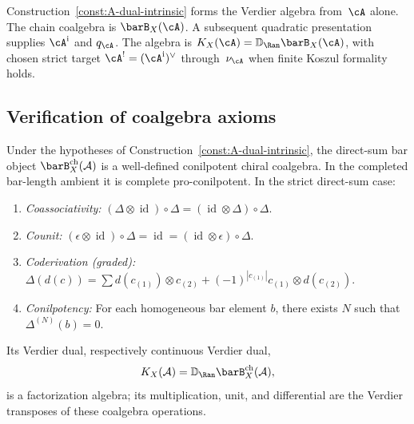 \begin{remark}\label{rem:intrinsic-nature}
Construction~\ref{const:A-dual-intrinsic} forms the Verdier algebra
from~$\cA$ alone. The chain coalgebra is $\barB_X(\cA)$. A subsequent
quadratic presentation supplies
$\cA^{\mathrm i}$ and $q_\cA$. The algebra is
$K_X(\cA)=\mathbb{D}_{\Ran}\barB_X(\cA)$, with chosen strict target
$\cA^!=(\cA^{\mathrm i})^\vee$ through~$\nu_\cA$ when finite Koszul formality
holds.
\end{remark}

\subsection{Verification of coalgebra axioms}

\begin{theorem}\label{thm:coalgebra-via-NAP}
Under the hypotheses of Construction~\ref{const:A-dual-intrinsic},
the direct-sum bar object $\barB_X^{\mathrm{ch}}(\mathcal{A})$ is a
well-defined conilpotent chiral coalgebra. In the completed
bar-length ambient it is complete pro-conilpotent. In the strict
direct-sum case:
\begin{enumerate}
\item \emph{Coassociativity:}
$(\Delta \otimes \operatorname{id}) \circ \Delta = (\operatorname{id} \otimes \Delta) \circ \Delta$.
\item \emph{Counit:}
$(\epsilon \otimes \operatorname{id}) \circ \Delta = \operatorname{id} = (\operatorname{id} \otimes \epsilon) \circ \Delta$.
\item \emph{Coderivation (graded):}
$\Delta(d(c)) = \sum d(c_{(1)}) \otimes c_{(2)} + (-1)^{|c_{(1)}|} c_{(1)} \otimes d(c_{(2)})$.
\item \emph{Conilpotency:}
For each homogeneous bar element $b$, there exists $N$ such that
$\Delta^{(N)}(b) = 0$.
\end{enumerate}
Its Verdier dual, respectively continuous Verdier dual,
\[
K_X(\mathcal A)=\mathbb{D}_{\Ran}\barB_X^{\mathrm{ch}}(\mathcal{A}),
\]
is a factorization algebra; its multiplication, unit, and differential
are the Verdier transposes of these coalgebra operations.
\end{theorem}

